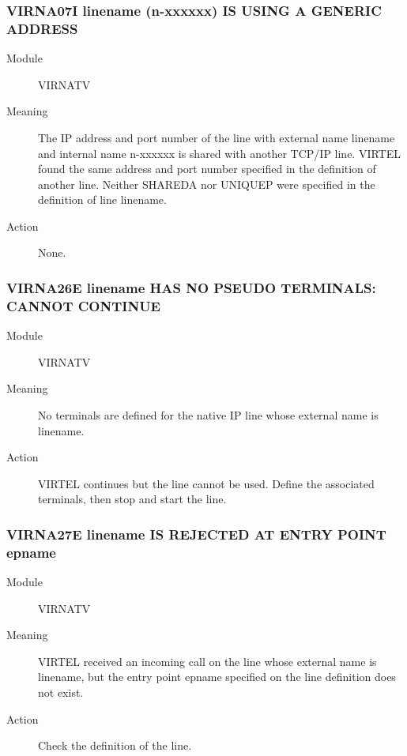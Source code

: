 \documentclass[letterpaper,10pt,english]{sphinxmanual}
\begin{document}
\subsubsection{VIRNA07I linename (n-xxxxxx) IS USING A GENERIC ADDRESS}
\label{\detokenize{messages:virna07i-linename-n-xxxxxx-is-using-a-generic-address}}\begin{description}
\item[{Module}] \leavevmode
VIRNATV

\item[{Meaning}] \leavevmode
The IP address and port number of the line with external name linename and internal name n-xxxxxx is shared with another TCP/IP line. VIRTEL found the same address and port number specified in the definition of another line. Neither SHAREDA nor UNIQUEP were specified in the definition of line linename.

\item[{Action}] \leavevmode
None.

\end{description}


\subsubsection{VIRNA26E linename HAS NO PSEUDO TERMINALS: CANNOT CONTINUE}
\label{\detokenize{messages:virna26e-linename-has-no-pseudo-terminals-cannot-continue}}\begin{description}
\item[{Module}] \leavevmode
VIRNATV

\item[{Meaning}] \leavevmode
No terminals are defined for the native IP line whose external name is linename.

\item[{Action}] \leavevmode
VIRTEL continues but the line cannot be used. Define the associated terminals, then stop and start the line.

\end{description}


\subsubsection{VIRNA27E linename IS REJECTED AT ENTRY POINT epname}
\label{\detokenize{messages:virna27e-linename-is-rejected-at-entry-point-epname}}\begin{description}
\item[{Module}] \leavevmode
VIRNATV

\item[{Meaning}] \leavevmode
VIRTEL received an incoming call on the line whose external name is linename, but the entry point epname specified on the line definition does not exist.

\item[{Action}] \leavevmode
Check the definition of the line.

\end{description}
\end{document}
